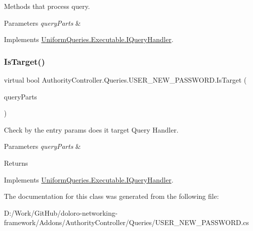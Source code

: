 Methods that process query. 


\begin{DoxyParams}{Parameters}
{\em query\+Parts} & \\
\hline
\end{DoxyParams}


Implements \mbox{\hyperlink{interface_uniform_queries_1_1_executable_1_1_i_query_handler_a3268d72c0388f5e3debba4d73bdfe523}{Uniform\+Queries.\+Executable.\+I\+Query\+Handler}}.

\mbox{\label{class_authority_controller_1_1_queries_1_1_u_s_e_r___n_e_w___p_a_s_s_w_o_r_d_aef792462301f1687630b64e5479f3f73}} 
\subsubsection{\texorpdfstring{Is\+Target()}{IsTarget()}}
{\footnotesize\ttfamily virtual bool Authority\+Controller.\+Queries.\+U\+S\+E\+R\+\_\+\+N\+E\+W\+\_\+\+P\+A\+S\+S\+W\+O\+R\+D.\+Is\+Target (\begin{DoxyParamCaption}\item[{\mbox{\hyperlink{struct_uniform_queries_1_1_query_part}{Query\+Part}} \mbox{[}$\,$\mbox{]}}]{query\+Parts }\end{DoxyParamCaption})\hspace{0.3cm}{\ttfamily [virtual]}}



Check by the entry params does it target Query Handler. 


\begin{DoxyParams}{Parameters}
{\em query\+Parts} & \\
\hline
\end{DoxyParams}
\begin{DoxyReturn}{Returns}

\end{DoxyReturn}


Implements \mbox{\hyperlink{interface_uniform_queries_1_1_executable_1_1_i_query_handler_a0f43184bf3e306a7cbebc39098f044ee}{Uniform\+Queries.\+Executable.\+I\+Query\+Handler}}.



The documentation for this class was generated from the following file\+:\begin{DoxyCompactItemize}
\item 
D\+:/\+Work/\+Git\+Hub/doloro-\/networking-\/framework/\+Addons/\+Authority\+Controller/\+Queries/U\+S\+E\+R\+\_\+\+N\+E\+W\+\_\+\+P\+A\+S\+S\+W\+O\+R\+D.\+cs\end{DoxyCompactItemize}
